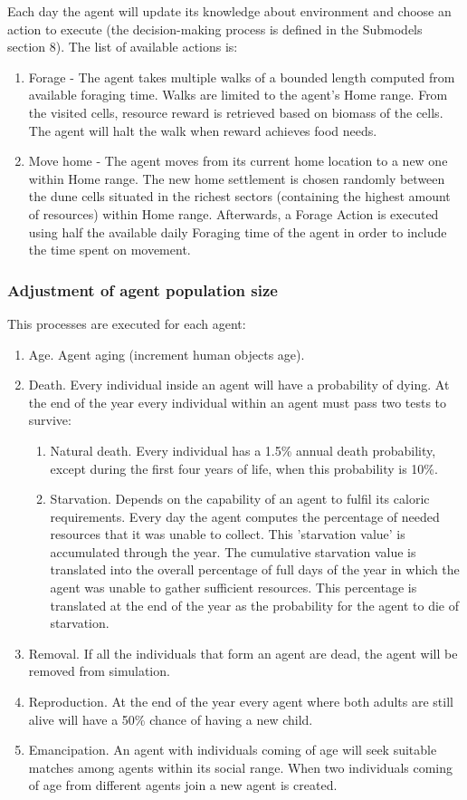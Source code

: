 \documentclass[11pt,oneside,a4paper,openright]{report}
\begin{document}
Each day the agent will update its knowledge about environment and choose an action to execute (the
decision-making process is defined in the Submodels section 8). The list of available actions is:
\begin{enumerate}
\item Forage - The agent takes multiple walks of a bounded length computed from available
foraging time. Walks are limited to the agent’s Home range. From the visited cells, resource
reward is retrieved based on biomass of the cells. The agent will halt the walk when reward
achieves food needs.
\item Move home - The agent moves from its current home location to a new one within Home
range. The new home settlement is chosen randomly between the dune cells situated in the
richest sectors (containing the highest amount of resources) within Home range. Afterwards, a
Forage Action is executed using half the available daily Foraging time of the agent in order to
include the time spent on movement.
\end{enumerate}


\subsubsection{Adjustment of agent population size}
This processes are executed for each agent:

\begin{enumerate}[1-]
	\item Age. Agent aging (increment human objects age).
	\item Death. Every individual inside an agent will have a probability of dying. At the end of the year
	every individual within an agent must pass two tests to survive:
	\begin{enumerate}
		\item Natural death. Every individual has a 1.5\% annual death probability, except during the
		first four years of life, when this probability is 10\%.
		\item Starvation. Depends on the capability of an agent to fulfil its caloric requirements. Every
		day the agent computes the percentage of needed resources that it was unable to collect.
		This 'starvation value' is accumulated through the year. The cumulative starvation value is
		translated into the overall percentage of full days of the year in which the agent was
		unable to gather sufficient resources. This percentage is translated at the end of the year
		as the probability for the agent to die of starvation.
	\end{enumerate}
	\item Removal. If all the individuals that form an agent are dead, the agent will be removed from
	simulation.
	\item Reproduction. At the end of the year every agent where both adults are still alive will have a
	50\% chance of having a new child.
	\item Emancipation. An agent with individuals coming of age will seek suitable matches among
	agents within its social range. When two individuals coming of age from different agents join a
	new agent is created.
\end{enumerate}
\end{document}
